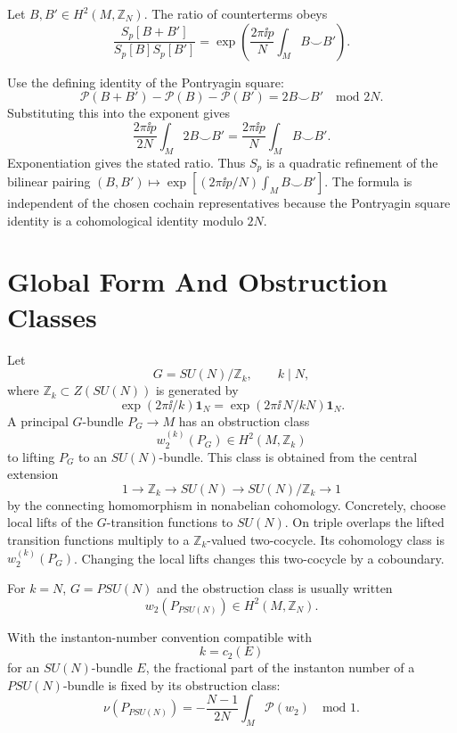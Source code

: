 \begin{remark}
\label{rem:pontryagin-square-quadratic-phase}
Let \(B,B'\in H^2(M,\mathbb Z_N)\).  The ratio of counterterms obeys
\[
  \frac{S_p[B+B']}{S_p[B]S_p[B']}
  =
  \exp\left(
    \frac{2\pi\ii p}{N}
    \int_M B\smile B'
  \right).
\]

Use the defining identity of the Pontryagin square:
\[
  \mathcal P(B+B')-\mathcal P(B)-\mathcal P(B')
  =
  2B\smile B'
  \quad\text{mod }2N .
\]
Substituting this into the exponent gives
\[
  \frac{2\pi\ii p}{2N}
  \int_M 2B\smile B'
  =
  \frac{2\pi\ii p}{N}
  \int_M B\smile B' .
\]
Exponentiation gives the stated ratio.
Thus \(S_p\) is a quadratic refinement of the bilinear pairing
\((B,B')\mapsto\exp[(2\pi\ii p/N)\int_M B\smile B']\).  The formula is
independent of the chosen cochain representatives because the Pontryagin
square identity is a cohomological identity modulo \(2N\).
\end{remark}

\section{Global Form And Obstruction Classes}

Let
\[
  G=SU(N)/\mathbb Z_k,\qquad k\mid N,
\]
where \(\mathbb Z_k\subset Z(SU(N))\) is generated by
\[
  \exp(2\pi\ii/k)\mathbf 1_N=\exp(2\pi\ii\,N/kN)\mathbf 1_N .
\]
A principal \(G\)-bundle \(P_G\to M\) has an obstruction class
\[
  w_2^{(k)}(P_G)\in H^2(M,\mathbb Z_k)
\]
to lifting \(P_G\) to an \(SU(N)\)-bundle.  This class is obtained from the
central extension
\[
  1\longrightarrow\mathbb Z_k
  \longrightarrow SU(N)
  \longrightarrow SU(N)/\mathbb Z_k
  \longrightarrow1
\]
by the connecting homomorphism in nonabelian cohomology.  Concretely, choose
local lifts of the \(G\)-transition functions to \(SU(N)\).  On triple
overlaps the lifted transition functions multiply to a \(\mathbb Z_k\)-valued
two-cocycle.  Its cohomology class is \(w_2^{(k)}(P_G)\).  Changing the local
lifts changes this two-cocycle by a coboundary.

For \(k=N\), \(G=PSU(N)\) and the obstruction class is usually written
\[
  w_2(P_{PSU(N)})\in H^2(M,\mathbb Z_N).
\]

\begin{proposition}
\label{prop:psu-n-fractional-instanton-number}
With the instanton-number convention compatible with
\[
  k=c_2(E)
\]
for an \(SU(N)\)-bundle \(E\), the fractional part of the instanton number of
a \(PSU(N)\)-bundle is fixed by its obstruction class:
\[
  \nu(P_{PSU(N)})
  =
  -\frac{N-1}{2N}\int_M\mathcal P(w_2)
  \quad\text{mod }1 .
\]
\end{proposition}

